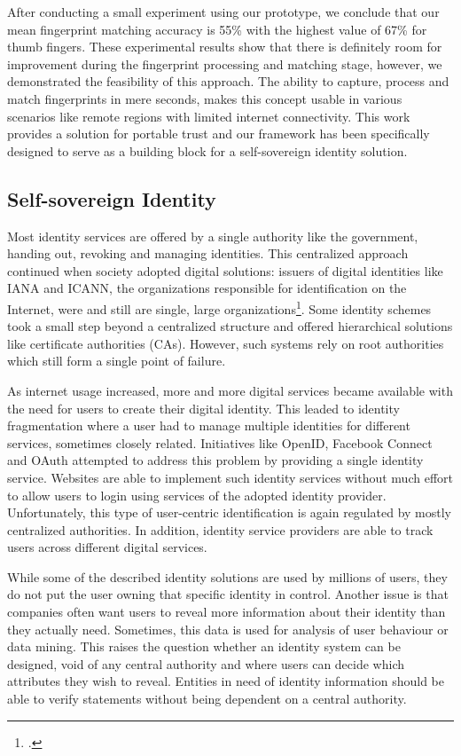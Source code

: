 \documentclass[USenglish]{article}
\begin{document}
After conducting a small experiment using our prototype, we conclude that our mean fingerprint matching accuracy is 55\% with the highest value of 67\% for thumb fingers.
These experimental results show that there is definitely room for improvement during the fingerprint processing and matching stage, however, we demonstrated the feasibility of this approach.
The ability to capture, process and match fingerprints in mere seconds, makes this concept usable in various scenarios like remote regions with limited internet connectivity.
This work provides a solution for portable trust and our framework has been specifically designed to serve as a building block for a self-sovereign identity solution.

\subsection{Self-sovereign Identity}

Most identity services are offered by a single authority like the government, handing out, revoking and managing identities.
This centralized approach continued when society adopted digital solutions: issuers of digital identities like IANA and ICANN, the organizations responsible for identification on the Internet, were and still are single, large organizations\footcite{pathtossi}.
Some identity schemes took a small step beyond a centralized structure and offered hierarchical solutions like certificate authorities (CAs).
However, such systems rely on root authorities which still form a single point of failure.

As internet usage increased, more and more digital services became available with the need for users to create their digital identity.
This leaded to identity  fragmentation where a user had to manage multiple identities for different services, sometimes closely related.
Initiatives like OpenID, Facebook Connect and OAuth attempted to address this problem by providing a single identity service.
Websites are able to implement such identity services without much effort to allow users to login using services of the adopted identity provider.
Unfortunately, this type of user-centric identification is again regulated by mostly centralized authorities.
In addition, identity service providers are able to track users across different digital services.

While some of the described identity solutions are used by millions of users, they do not put the user owning that specific identity in control.
Another issue is that companies often want users to reveal more information about their identity than they actually need.
Sometimes, this data is used for analysis of user behaviour or data mining.
This raises the question whether an identity system can be designed, void of any central authority and where users can decide which attributes they wish to reveal.
Entities in need of identity information should be able to verify statements without being dependent on a central authority.
\end{document}
